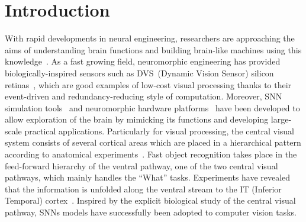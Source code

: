 \section{Introduction}
\label{sec:intro}
With rapid developments in neural engineering, researchers are approaching the aims of understanding brain functions and building brain-like machines using this knowledge~\citep{furber2007neural}.
As a fast growing field, neuromorphic engineering has provided biologically-inspired sensors such as DVS~(Dynamic Vision Sensor) silicon retinas~\citep{serrano2013128, delbruck2008frame}, which are good examples of low-cost visual processing thanks to their event-driven and redundancy-reducing style of computation.
Moreover, SNN simulation tools~\citep{davison2008pynn, gewaltig2007nest, goodman2008brian} and neuromorphic hardware platforms~\citep{furber2014spinnaker,  schemmel2010wafer, merolla2014million} have been developed to allow exploration of the brain by mimicking its functions and developing large-scale practical applications.
Particularly for visual processing, the central visual system consists of several cortical areas which are placed in a hierarchical pattern according to anatomical experiments~\citep{felleman1991distributed}.
Fast object recognition takes place in  the feed-forward hierarchy of the ventral pathway, one of the two central visual pathways, which mainly handles the ``What'' tasks.
Experiments have revealed that the information is unfolded along the ventral stream to the  IT (Inferior Temporal) cortex~\citep{dicarlo2012does}.
Inspired by the  explicit  biological study of the central visual pathway, SNNs models have successfully been adopted to computer vision tasks. 

